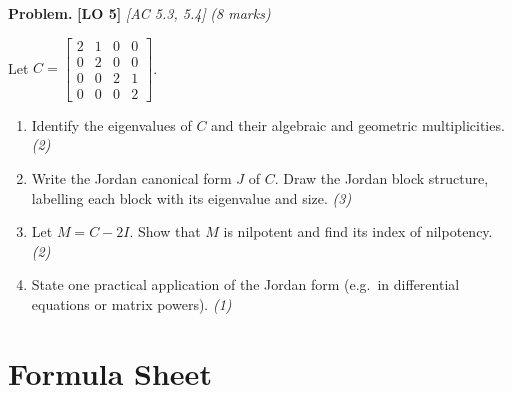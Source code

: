 \documentclass[12pt,a4paper]{article}
\newcommand{\lo}[1]{\textcolor{locolor}{\textbf{[LO #1]}}}
\newcommand{\ac}[1]{\textcolor{locolor}{\textit{[AC #1]}}}
\newcommand{\mat}[1]{\begin{bmatrix}#1\end{bmatrix}}
\begin{document}
	\begin{tcolorbox}[practice]
		\textbf{Problem.} \lo{5} \ac{5.3, 5.4} \hfill \textit{(8 marks)}
		
		Let $C = \mat{2&1&0&0\\0&2&0&0\\0&0&2&1\\0&0&0&2}$.
		
		\begin{enumerate}[label=(\alph*)]
			\item Identify the eigenvalues of $C$ and their algebraic and geometric multiplicities. \hfill\textit{(2)}
			\item Write the Jordan canonical form $J$ of $C$. Draw the Jordan block structure, labelling each block with its eigenvalue and size. \hfill\textit{(3)}
			\item Let $M = C - 2I$. Show that $M$ is nilpotent and find its index of nilpotency. \hfill\textit{(2)}
			\item State one practical application of the Jordan form (e.g.\ in differential equations or matrix powers). \hfill\textit{(1)}
		\end{enumerate}
	\end{tcolorbox}
	
	\begin{tcolorbox}[answer]
	\end{tcolorbox}
	
	\newpage
	
	\section*{Formula Sheet}
	
\end{document}
